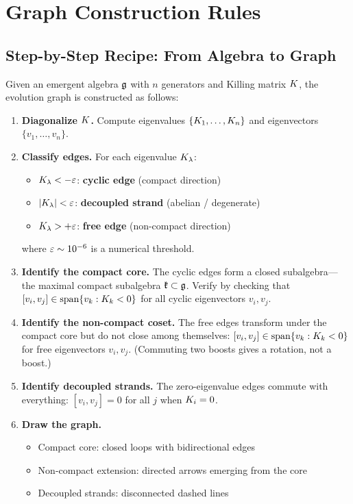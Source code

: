 \section{Graph Construction Rules}\label{sec:construction_rules}

\subsection{Step-by-Step Recipe: From Algebra to Graph}\label{sec:recipe}

Given an emergent algebra $\mathfrak{g}$ with $n$ generators and Killing matrix $K$, the evolution graph is constructed as follows:

\begin{enumerate}
    \item \textbf{Diagonalize $K$.} Compute eigenvalues $\{K_1, \ldots, K_n\}$ and eigenvectors $\{v_1, \ldots, v_n\}$.
    
    \item \textbf{Classify edges.} For each eigenvalue $K_\lambda$:
    \begin{itemize}
        \item $K_\lambda < -\varepsilon$: \textbf{cyclic edge} (compact direction)
        \item $|K_\lambda| < \varepsilon$: \textbf{decoupled strand} (abelian / degenerate)
        \item $K_\lambda > +\varepsilon$: \textbf{free edge} (non-compact direction)
    \end{itemize}
    where $\varepsilon \sim 10^{-6}$ is a numerical threshold.
    
    \item \textbf{Identify the compact core.} The cyclic edges form a closed subalgebra---the maximal compact subalgebra $\mathfrak{k} \subset \mathfrak{g}$. Verify by checking that $[v_i, v_j] \in \mathrm{span}\{v_k : K_k < 0\}$ for all cyclic eigenvectors $v_i, v_j$.
    
    \item \textbf{Identify the non-compact coset.} The free edges transform under the compact core but do not close among themselves: $[v_i, v_j] \in \mathrm{span}\{v_k : K_k < 0\}$ for free eigenvectors $v_i, v_j$. (Commuting two boosts gives a rotation, not a boost.)
    
    \item \textbf{Identify decoupled strands.} The zero-eigenvalue edges commute with everything: $[v_i, v_j] = 0$ for all $j$ when $K_i = 0$.
    
    \item \textbf{Draw the graph.}
    \begin{itemize}
        \item Compact core: closed loops with bidirectional edges
        \item Non-compact extension: directed arrows emerging from the core
        \item Decoupled strands: disconnected dashed lines
    \end{itemize}
\end{enumerate}

